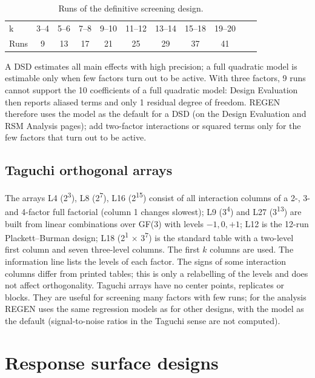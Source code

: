 \begin{table}[htbp]
\centering
\caption{Runs of the definitive screening design.}
\label{tab:ch03-dsd}
\small
\begin{tabular}{@{}lcccccccccc@{}}
\toprule
k & 3--4 & 5--6 & 7--8 & 9--10 & 11--12 & 13--14 & 15--18 & 19--20 \\
Runs & 9 & 13 & 17 & 21 & 25 & 29 & 37 & 41 \\
\bottomrule
\end{tabular}
\end{table}

A DSD estimates all main effects with high precision; a full quadratic model is estimable only when few factors
turn out to be active. With three factors, 9 runs cannot support the 10 coefficients of a full quadratic model:
Design Evaluation then reports aliased terms and only 1 residual degree of freedom. REGEN therefore uses the
 model as the default for a DSD (on the Design Evaluation and RSM Analysis pages); add
two-factor interactions or squared terms only for the few factors that turn out to be active.

\subsection{Taguchi orthogonal arrays}
The arrays L4 (2\textsuperscript{3}), L8 (2\textsuperscript{7}), L16 (2\textsuperscript{15}) consist of all
interaction columns of a 2-, 3- and 4-factor full factorial (column 1 changes slowest); L9 (3\textsuperscript{4})
and L27 (3\textsuperscript{13}) are built from linear combinations over GF(3) with levels $-1, 0, +1$; L12 is the
12-run Plackett--Burman design; L18 (2\textsuperscript{1} $\times$ 3\textsuperscript{7}) is the standard table
with a two-level first column and seven three-level columns. The first $k$ columns are used. The information line
lists the levels of each factor. The signs of some interaction columns differ from printed tables; this is only a
relabelling of the levels and does not affect orthogonality. Taguchi arrays have no center points, replicates or
blocks. They are useful for screening many factors with few runs; for the analysis REGEN uses the same regression
models as for other designs, with the  model as the default (signal-to-noise ratios in the Taguchi sense
are not computed).

\section{Response surface designs}
\label{sec:ch03-rsm}

